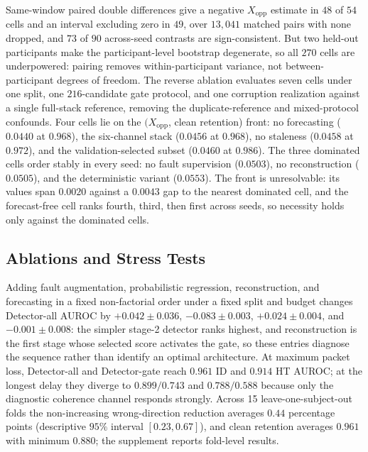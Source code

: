 \documentclass[letterpaper]{article} %
\begin{document}
Same-window paired double differences give a negative $X_{\mathrm{opp}}$ estimate in $48$ of $54$ cells and an interval excluding zero in $49$, over $13{,}041$ matched pairs with none dropped, and $73$ of $90$ across-seed contrasts are sign-consistent. But two held-out participants make the participant-level bootstrap degenerate, so all $270$ cells are underpowered: pairing removes within-participant variance, not between-participant degrees of freedom.
The reverse ablation evaluates seven cells under one split, one $216$-candidate gate protocol, and one corruption realization against a single full-stack reference, removing the duplicate-reference and mixed-protocol confounds. Four cells lie on the $(X_{\mathrm{opp}}$, clean retention) front: no forecasting ($0.0440$ at $0.968$), the six-channel stack ($0.0456$ at $0.968$), no staleness ($0.0458$ at $0.972$), and the validation-selected subset ($0.0460$ at $0.986$). The three dominated cells order stably in every seed: no fault supervision ($0.0503$), no reconstruction ($0.0505$), and the deterministic variant ($0.0553$). The front is unresolvable: its values span $0.0020$ against a $0.0043$ gap to the nearest dominated cell, and the forecast-free cell ranks fourth, third, then first across seeds, so necessity holds only against the dominated cells.

\subsection{Ablations and Stress Tests}

Adding fault augmentation, probabilistic regression, reconstruction, and forecasting in a fixed non-factorial order under a fixed split and budget changes Detector-all AUROC by $+0.042\pm0.036$, $-0.083\pm0.003$, $+0.024\pm0.004$, and $-0.001\pm0.008$: the simpler stage-2 detector ranks highest, and reconstruction is the first stage whose selected score activates the gate, so these entries diagnose the sequence rather than identify an optimal architecture.
At maximum packet loss, Detector-all and Detector-gate reach $0.961$ ID and $0.914$ HT AUROC; at the longest delay they diverge to $0.899/0.743$ and $0.788/0.588$ because only the diagnostic coherence channel responds strongly. Across 15 leave-one-subject-out folds the non-increasing wrong-direction reduction averages $0.44$ percentage points (descriptive $95\%$ interval $[0.23,0.67]$), and clean retention averages $0.961$ with minimum $0.880$; the supplement reports fold-level results.
\end{document}
